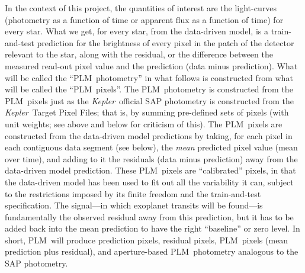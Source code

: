 \documentclass[12pt, preprint]{aastex}
\newcommand{\project}[1]{\textsl{#1}}
\newcommand{\Kepler}{\project{Kepler}}
\newcommand{\name}{PLM}
\begin{document}
In the context of this project, the quantities of interest are the light-curves
  (photometry as a function of time or apparent flux as a function of time)
  for every star.
What we get, for every star, from the data-driven model, is a train-and-test prediction
  for the brightness of every pixel in the patch of the detector relevant to the star,
  along with the residual, or the difference between the measured read-out pixel value and the prediction (data minus prediction).
What will be called the ``\name\ photometry'' in what follows is constructed from what will be called the ``\name\ pixels''.
The \name\ photometry is constructed from the \name\ pixels
  just as the \Kepler\ official SAP photometry is constructed from the \Kepler\ Target Pixel Files;
  that is, by summing pre-defined sets of pixels (with unit weights; see above and below for criticism of this).
The \name\ pixels are constructed from the data-driven model predictions by taking,
  for each pixel in each contiguous data segment (see below),
  the \emph{mean} predicted pixel value (mean over time),
  and adding to it the residuals (data minus prediction) away from the data-driven model prediction.
These \name\ pixels are ``calibrated'' pixels,
  in that the data-driven model has been used to fit out all the variability it can,
  subject to the restrictions imposed by its finite freedom and the train-and-test specification.
The signal---in which exoplanet transits will be found---is fundamentally the observed residual away from this prediction,
  but it has to be added back into the mean prediction to have the right ``baseline'' or zero level.
In short, \name\ will produce prediction pixels, residual pixels, \name\ pixels (mean prediction plus residual),
  and aperture-based \name\ photometry analogous to the SAP photometry.
\end{document}
